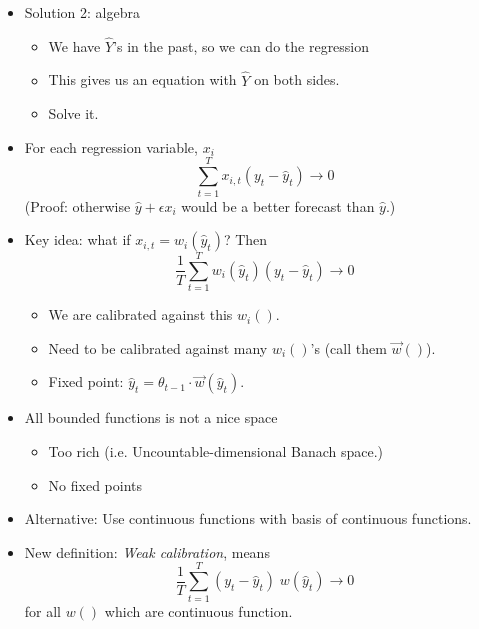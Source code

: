 \documentclass[landscape]{slides}
\begin{document}

\begin{itemize}
\item Solution 2: algebra
\begin{itemize}
\item We have $\hat Y$'s in the past, so we can do the regression
\item This gives us an equation with $\hat Y$ on both sides.
\item Solve it.
\end{itemize}
\end{itemize}



\begin{itemize}
\item For each regression variable, $x_i$
\begin{displaymath}
\sum_{t=1}^T x_{i,t} (y_t - \hat{y}_t) \to 0
\end{displaymath}
(Proof: otherwise $\hat{y} + \epsilon x_{i}$
would be a better forecast than $\hat{y}$.)
\item Key idea: what if $x_{i,t} = w_i(\hat{y}_t)$?  Then
\begin{displaymath}
\frac{1}{T} \sum_{t=1}^T w_i(\hat{y}_t) (y_t - \hat{y}_t) \to 0
\end{displaymath}
\begin{itemize}
\item We are calibrated against this $w_i()$.
\item Need to be calibrated against many $w_i()$'s (call them $\vec{w}()$).
\item Fixed point: $\hat{y}_t = \theta_{t-1} \cdot \vec{w}(\hat{y}_t)$.
\end{itemize}
\end{itemize}

\begin{itemize}
\item All bounded functions is not a nice space
\begin{itemize}
\item Too rich (i.e.  Uncountable-dimensional Banach space.)
\item No fixed points
\end{itemize}
\item Alternative: Use continuous functions with basis of continuous functions.
\item New definition: {\em Weak calibration}, means 
\begin{displaymath}
\frac{1}{T} \sum_{t=1}^T (y_t - \hat{y}_t) \; w(\hat{y}_t) \to 0
\end{displaymath}
for all $w()$ which are continuous function.
\end{itemize}
\end{document}

